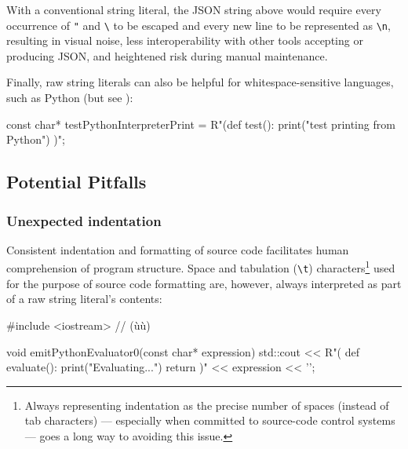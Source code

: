\noindent With a conventional string literal, the JSON string above would require
every occurrence of \lstinline!"! and \lstinline!\! to be escaped
and every new line to be represented as \lstinline!\n!, resulting
in visual noise, less interoperability with other tools accepting or
producing JSON, and heightened risk during manual maintenance.

Finally, raw string literals can also be helpful for
whitespace-sensitive languages, such as Python (but see ): 

\begin{emcppslisting}
const char* testPythonInterpreterPrint = R"(def test():
    print("test printing from Python")
)";
\end{emcppslisting}
    

\subsection[Potential Pitfalls]{Potential Pitfalls}\label{potential-pitfalls-rawstringliteral}

\subsubsection[Unexpected indentation]{Unexpected indentation}\label{unexpected-indentation}

Consistent indentation and formatting of source code facilitates human
comprehension of program structure. Space and tabulation
(\lstinline!\t!) characters{\cprotect\footnote{Always
representing indentation as the precise number of spaces (instead of
tab characters) --- especially when committed to source-code control
  systems --- goes a long way to avoiding this issue.}} used for the
purpose of source code formatting are, however, always interpreted as
part of a raw string literal's contents:

\begin{emcppshiddenlisting}[emcppsbatch={e2,e3,e4}]
#include <iostream>  // (ù{}ù)
\end{emcppshiddenlisting}
\begin{emcppslisting}[emcppsbatch=e2]
void emitPythonEvaluator0(const char* expression)
{
    std::cout << R"(
        def evaluate():
            print("Evaluating...")
            return )" << expression << '\n';
}
\end{emcppslisting}
    
